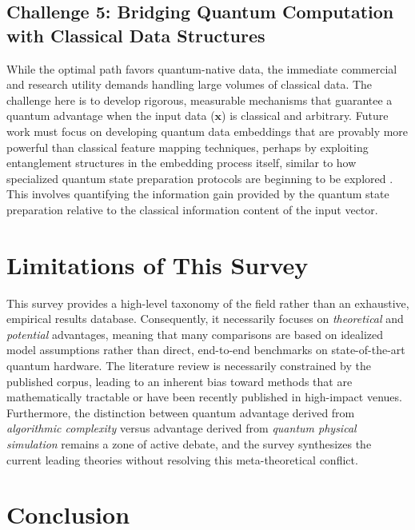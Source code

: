 \documentclass{article}
\begin{document}
\subsection{Challenge 5: Bridging Quantum Computation with Classical Data Structures}

\label{sec:challenge_5\_bridging\_quantum\_computation}

While the optimal path favors quantum-native data, the immediate commercial and research utility demands handling large volumes of classical data. The challenge here is to develop rigorous, measurable mechanisms that guarantee a quantum advantage when the input data ($\mathbf{x}$) is classical and arbitrary. Future work must focus on developing quantum data embeddings that are provably more powerful than classical feature mapping techniques, perhaps by exploiting entanglement structures in the embedding process itself, similar to how specialized quantum state preparation protocols are beginning to be explored \cite{shukla2024efficient}. This involves quantifying the information gain provided by the quantum state preparation relative to the classical information content of the input vector.

\section{Limitations of This Survey}

\label{sec:limitations\_of\_this\_survey}

This survey provides a high-level taxonomy of the field rather than an exhaustive, empirical results database. Consequently, it necessarily focuses on \textit{theoretical} and \textit{potential} advantages, meaning that many comparisons are based on idealized model assumptions rather than direct, end-to-end benchmarks on state-of-the-art quantum hardware. The literature review is necessarily constrained by the published corpus, leading to an inherent bias toward methods that are mathematically tractable or have been recently published in high-impact venues. Furthermore, the distinction between quantum advantage derived from \textit{algorithmic complexity} versus advantage derived from \textit{quantum physical simulation} remains a zone of active debate, and the survey synthesizes the current leading theories without resolving this meta-theoretical conflict.

\section{Conclusion}
\end{document}
